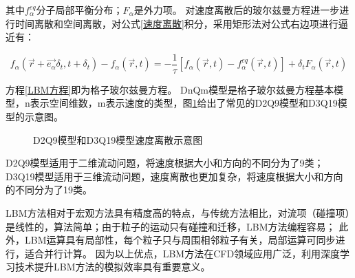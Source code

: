 \noindent 其中$f_{\alpha}^{e q}$分子局部平衡分布；$F_{\alpha}$是外力项。
对速度离散后的玻尔兹曼方程进一步进行时间离散和空间离散，对公式\ref{速度离散}积分，采用矩形法对公式右边项进行逼近有：

\begin{equation}
\label{LBM方程}
f_{\alpha}\left(\vec{r}+\overrightarrow{e_{\alpha}} \delta_{t}, t+\delta_{t}\right)-f_{\alpha}(\vec{r}, t)=-\frac{1}{\tau}\left[f_{\alpha}(\vec{r}, t)-f_{\alpha}^{e q}(\vec{r}, t)\right]+\delta_{t} F_{\alpha}(\vec{r}, t)\end{equation}

方程\ref{LBM方程}即为格子玻尔兹曼方程。
DnQm模型\cite{Y1992Lattice}是格子玻尔兹曼方程基本模型，n表示空间维数，m表示速度的类型，图\ref{fig:dnqm}给出了常见的D2Q9模型和D3Q19模型的示意图。


\begin{figure}[htb]
	\centering
	 \qquad
	\caption{D2Q9模型和D3Q19模型速度离散示意图}
	\label{fig:dnqm}
\end{figure}

\noindent D2Q9模型适用于二维流动问题，将速度根据大小和方向的不同分为了9类；
D3Q19模型适用于三维流动问题，速度离散也更加复杂，将速度根据大小和方向的不同分为了19类。

LBM方法相对于宏观方法具有精度高的特点，与传统方法相比，对流项（碰撞项）是线性的，算法简单；由于粒子的运动只有碰撞和迁移，LBM方法编程容易；
此外，LBM运算具有局部性，每个粒子只与周围相邻粒子有关，局部运算可同步进行，适合并行计算。
因为以上优点，LBM方法在CFD领域应用广泛，利用深度学习技术提升LBM方法的模拟效率具有重要意义。


